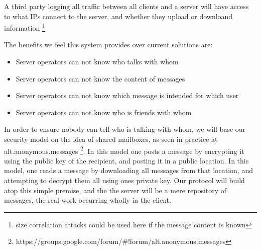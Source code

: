 A third party logging all traffic between all clients and a server will have
access to  what IPs connect to the
server, and whether they upload or downloand information \footnote{size
correlation attacks could be used here if the message content is known}

The benefits we feel this system provides over current solutions are:
\begin{itemize}
\item Server operators can not know who talks with whom
\item Server operators can not know the content of messages
\item Server operators can not know which message is intended for which user
\item Server operators can not know who is friends with whom
\end{itemize}

In order to ensure nobody can tell who is talking with whom, we will base our
security model on the idea of shared mailboxes, as seen in practice at
alt.anonymous.messages
\footnote{https://groups.google.com/forum/\#!forum/alt.anonymous.messages}.
In this model one posts a message by encrypting it using the public key of the
recipient, and posting it in a public location. In this model, one reads a
message by downloading all messages from that location, and attempting to
decrypt them all using ones private key. Our protocol will build atop this
simple premise, and the the server will be a mere repository of messages, the
real work occurring wholly in the client.
